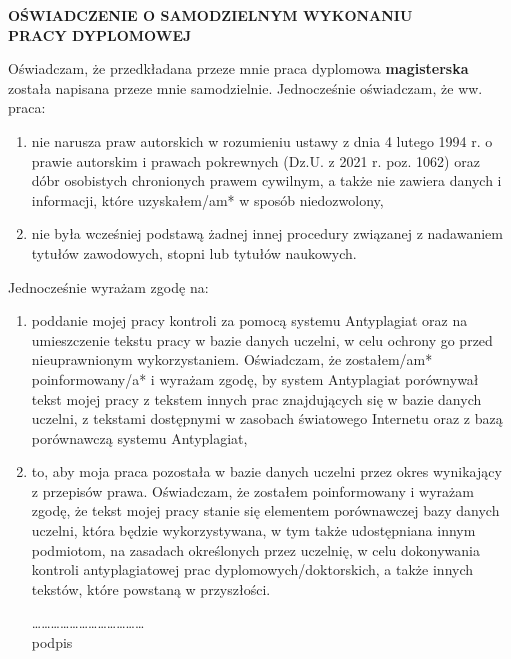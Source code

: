 \begingroup
\begin{small}
\begin{center}
     \large  \textbf{ OŚWIADCZENIE O SAMODZIELNYM WYKONANIU \\ PRACY DYPLOMOWEJ}
\end{center}

Oświadczam, że przedkładana przeze mnie praca dyplomowa \textbf{magisterska} została napisana przeze mnie samodzielnie. Jednocześnie oświadczam, że ww. praca: 
\begin{enumerate}
\item nie narusza praw autorskich w rozumieniu ustawy z dnia 4 lutego 1994 r. o prawie autorskim i prawach pokrewnych (Dz.U. z 2021 r. poz. 1062) oraz dóbr osobistych chronionych prawem cywilnym, a także nie zawiera danych i informacji, które uzyskałem/am* w sposób niedozwolony,
\item nie była wcześniej podstawą żadnej innej procedury związanej z nadawaniem tytułów zawodowych, stopni lub tytułów naukowych.

\end{enumerate}

Jednocześnie wyrażam zgodę na:


\begin{enumerate}

\item poddanie mojej pracy kontroli za pomocą systemu Antyplagiat oraz na umieszczenie tekstu pracy w bazie danych uczelni, w celu ochrony go przed nieuprawnionym wykorzystaniem. Oświadczam, że zostałem/am* poinformowany/a* i wyrażam zgodę, by system Antyplagiat porównywał tekst mojej pracy z tekstem innych prac znajdujących się w bazie danych uczelni, z tekstami dostępnymi w zasobach światowego Internetu oraz z bazą porównawczą systemu Antyplagiat,
\item to, aby moja praca pozostała w bazie danych uczelni przez okres wynikający z przepisów prawa. Oświadczam, że zostałem poinformowany i wyrażam zgodę, że tekst mojej pracy stanie się elementem porównawczej bazy danych uczelni, która będzie wykorzystywana, w tym także udostępniana innym podmiotom, na zasadach określonych przez uczelnię, w celu dokonywania kontroli antyplagiatowej prac dyplomowych/doktorskich, a także innych tekstów, które powstaną w przyszłości.



\begin{flushright}
……………………………… \\
podpis
\end{flushright}



\end{enumerate}
\end{small}
